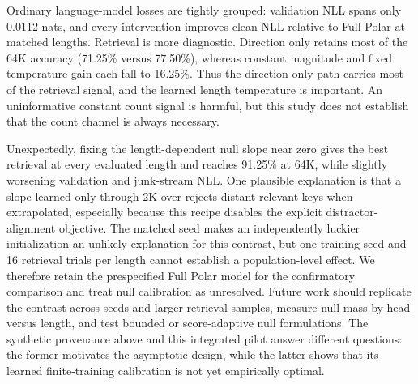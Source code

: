 \begin{table}[!ht]
\centering
\small
\setlength{\tabcolsep}{3.5pt}
\caption{Single-seed, 1B-token Polar component attribution. Needle values are teacher-forced five-token accuracy over 16 trials per length. All variants share the same seed, but this design does not estimate variation across training seeds.}
\label{table:polar_components}
\end{table}

Ordinary language-model losses are tightly grouped: validation NLL spans only 0.0112 nats, and every intervention improves clean NLL relative to Full Polar at matched lengths. Retrieval is more diagnostic. Direction only retains most of the 64K accuracy (71.25\% versus 77.50\%), whereas constant magnitude and fixed temperature gain each fall to 16.25\%. Thus the direction-only path carries most of the retrieval signal, and the learned length temperature is important. An uninformative constant count signal is harmful, but this study does not establish that the count channel is always necessary.

Unexpectedly, fixing the length-dependent null slope near zero gives the best retrieval at every evaluated length and reaches 91.25\% at 64K, while slightly worsening validation and junk-stream NLL. One plausible explanation is that a slope learned only through 2K over-rejects distant relevant keys when extrapolated, especially because this recipe disables the explicit distractor-alignment objective. The matched seed makes an independently luckier initialization an unlikely explanation for this contrast, but one training seed and 16 retrieval trials per length cannot establish a population-level effect. We therefore retain the prespecified Full Polar model for the confirmatory comparison and treat null calibration as unresolved. Future work should replicate the contrast across seeds and larger retrieval samples, measure null mass by head versus length, and test bounded or score-adaptive null formulations. The synthetic provenance above and this integrated pilot answer different questions: the former motivates the asymptotic design, while the latter shows that its learned finite-training calibration is not yet empirically optimal.

